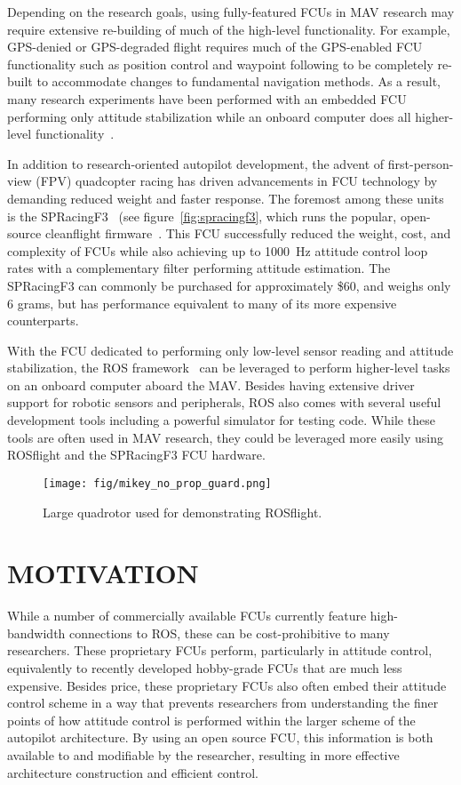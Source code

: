 \documentclass[letterpaper, 10 pt, conference]{ieeeconf}  %
\begin{document}
Depending on the research goals, using fully-featured FCUs in MAV research may require extensive re-building of much of the high-level functionality.  For example, GPS-denied or GPS-degraded flight requires much of the GPS-enabled FCU functionality such as position control and waypoint following to be completely re-built to accommodate changes to fundamental navigation methods.  As a result, many research experiments have been performed with an embedded FCU performing only attitude stabilization while an onboard computer does all higher-level functionality~\cite{Engel2012,Shen2011,Haines2011,Blosch2010}. 

In addition to research-oriented autopilot development, the advent of first-person-view (FPV) quadcopter racing has driven advancements in FCU technology by demanding reduced weight and faster response.  The foremost among these units is the SPRacingF3~\cite{3_seriouslypro.com_2016} (see figure~\ref{fig:spracingf3}, which runs the popular, open-source cleanflight firmware~\cite{4_cleanflight.com_2016}.  This FCU successfully reduced the weight, cost, and complexity of FCUs while also achieving up to 1000~Hz attitude control loop rates with a complementary filter performing attitude estimation.  The SPRacingF3 can commonly be purchased for approximately \$60, and weighs only 6 grams, but has performance equivalent to many of its more expensive counterparts.

With the FCU dedicated to performing only low-level sensor reading and attitude stabilization, the ROS framework~\cite{Quigley2009} can be leveraged to perform higher-level tasks on an onboard computer aboard the MAV. Besides having extensive driver support for robotic sensors and peripherals, ROS also comes with several useful development tools including a powerful simulator for testing code.  While these tools are often used in MAV research, they could be leveraged more easily using ROSflight and the SPRacingF3 FCU hardware. 

\begin{figure}
	\texttt{[image: fig/mikey\_no\_prop\_guard.png]}
	\caption{Large quadrotor used for demonstrating ROSflight.}
		\label{fig:mikey}
\end{figure}

\section{MOTIVATION}

While a number of commercially available FCUs currently feature high-bandwidth connections to ROS, these can be cost-prohibitive to many researchers.  These proprietary FCUs perform, particularly in attitude control, equivalently to recently developed hobby-grade FCUs that are much less expensive. Besides price, these proprietary FCUs also often embed their attitude control scheme in a way that prevents researchers from understanding the finer points of how attitude control is performed within the larger scheme of the autopilot architecture.  By using an open source FCU, this information is both available to and modifiable by the researcher, resulting in more effective architecture construction and efficient control.
\end{document}
